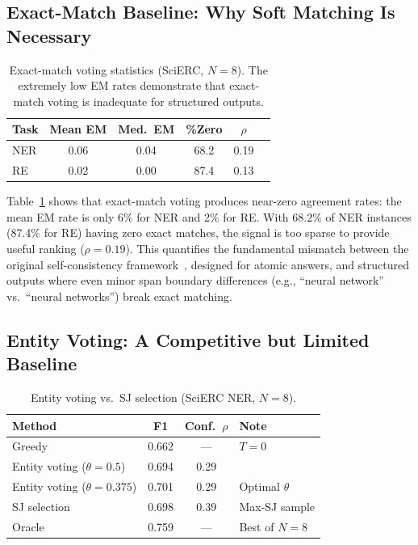 \documentclass[11pt,a4paper]{article}
\begin{document}
\subsection{Exact-Match Baseline: Why Soft Matching Is Necessary}
\label{sec:exact_match}

\begin{table}[t]
\centering
\small
\caption{Exact-match voting statistics (SciERC, $N{=}8$). The extremely low EM rates demonstrate that exact-match voting is inadequate for structured outputs.}
\label{tab:em}
\begin{tabular}{lccccc}
\toprule
\textbf{Task} & \textbf{Mean EM} & \textbf{Med.\ EM} & \textbf{\%Zero} & \textbf{$\rho$} \\
\midrule
NER & 0.06 & 0.04 & 68.2 & 0.19 \\
RE  & 0.02 & 0.00 & 87.4 & 0.13 \\
\bottomrule
\end{tabular}
\end{table}

Table~\ref{tab:em} shows that exact-match voting produces near-zero agreement rates: the mean EM rate is only 6\% for NER and 2\% for RE. With 68.2\% of NER instances (87.4\% for RE) having zero exact matches, the signal is too sparse to provide useful ranking ($\rho{=}0.19$). This quantifies the fundamental mismatch between the original self-consistency framework~\cite{wang2023selfconsistency}, designed for atomic answers, and structured outputs where even minor span boundary differences (e.g., ``neural network'' vs.\ ``neural networks'') break exact matching.

\subsection{Entity Voting: A Competitive but Limited Baseline}
\label{sec:entity_voting}

\begin{table}[t]
\centering
\small
\caption{Entity voting vs.\ SJ selection (SciERC NER, $N{=}8$).}
\label{tab:entity_voting}
\begin{tabular}{lccl}
\toprule
\textbf{Method} & \textbf{F1} & \textbf{Conf.\ $\rho$} & \textbf{Note} \\
\midrule
Greedy & 0.662 & --- & $T{=}0$ \\
Entity voting ($\theta{=}0.5$) & 0.694 & 0.29 & \\
Entity voting ($\theta{=}0.375$) & 0.701 & 0.29 & Optimal $\theta$ \\
SJ selection & 0.698 & 0.39 & Max-SJ sample \\
Oracle & 0.759 & --- & Best of $N{=}8$ \\
\bottomrule
\end{tabular}
\end{table}
\end{document}
